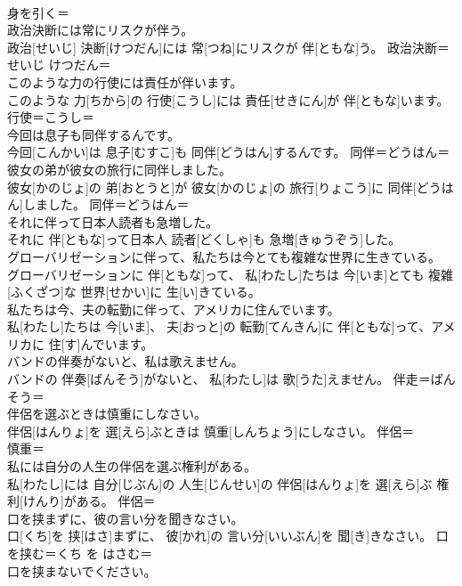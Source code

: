 \documentclass[8pt]{extreport}
\begin{document}
\begin{CJK}{UTF8}{min}
\\	身を引く＝ 
\\	政治決断には常にリスクが伴う。	
\\	政治[せいじ] 決断[けつだん]には 常[つね]にリスクが 伴[ともな]う。	政治決断＝せいじ けつだん＝ 
\\	このような力の行使には責任が伴います。	
\\	このような 力[ちから]の 行使[こうし]には 責任[せきにん]が 伴[ともな]います。	行使＝こうし＝ 
\\	今回は息子も同伴するんです。	
\\	今回[こんかい]は 息子[むすこ]も 同伴[どうはん]するんです。	同伴＝どうはん＝ 
\\	彼女の弟が彼女の旅行に同伴しました。	
\\	彼女[かのじょ]の 弟[おとうと]が 彼女[かのじょ]の 旅行[りょこう]に 同伴[どうはん]しました。	同伴＝どうはん＝ 
\\	それに伴って日本人読者も急増した。	
\\	それに 伴[ともな]って日本人 読者[どくしゃ]も 急増[きゅうぞう]した。	
\\	グローバリゼーションに伴って、私たちは今とても複雑な世界に生きている。	
\\	グローバリゼーションに 伴[ともな]って、 私[わたし]たちは 今[いま]とても 複雑[ふくざつ]な 世界[せかい]に 生[い]きている。	
\\	私たちは今、夫の転勤に伴って、アメリカに住んでいます。	
\\	私[わたし]たちは 今[いま]、 夫[おっと]の 転勤[てんきん]に 伴[ともな]って、アメリカに 住[す]んでいます。	
\\	バンドの伴奏がないと、私は歌えません。	
\\	バンドの 伴奏[ばんそう]がないと、 私[わたし]は 歌[うた]えません。	伴走＝ばんそう＝ 
\\	伴侶を選ぶときは慎重にしなさい。	
\\	伴侶[はんりょ]を 選[えら]ぶときは 慎重[しんちょう]にしなさい。	伴侶＝ 
\\	慎重＝ 
\\	私には自分の人生の伴侶を選ぶ権利がある。	
\\	私[わたし]には 自分[じぶん]の 人生[じんせい]の 伴侶[はんりょ]を 選[えら]ぶ 権利[けんり]がある。	伴侶＝ 
\\	口を挟まずに、彼の言い分を聞きなさい。	
\\	口[くち]を 挟[はさ]まずに、 彼[かれ]の 言い分[いいぶん]を 聞[き]きなさい。	口を挟む＝くち を はさむ＝ 
\\	口を挟まないでください。	

\end{CJK}
\end{document}
